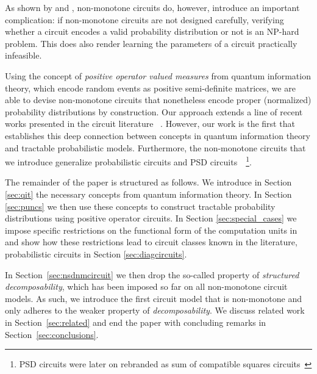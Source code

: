As shown by \citet{harviainen2023inference} and \citet{agarwalprobabilistic}, non-monotone circuits do, however, introduce an important complication: if non-monotone circuits are not designed carefully, verifying whether a circuit encodes a valid probability distribution or not is an NP-hard problem. This does also render learning the parameters of a circuit practically infeasible.

Using the concept of \textit{positive operator valued measures} from quantum information theory, which encode random events as positive semi-definite matrices, we are able to devise non-monotone circuits that nonetheless encode proper (normalized) probability distributions by construction.
Our approach extends a line of recent works presented in the circuit literature ~\citep{sladek2023encoding,loconte2024subtractive,wangrelationship,loconte2025sum}. However, our work is the first that establishes this deep connection between concepts in quantum information theory and tractable probabilistic models.
Furthermore, the non-monotone circuits that we introduce generalize probabilistic circuits and PSD circuits~~\citep{sladek2023encoding,loconte2024subtractive,loconte2025sum}\footnote{PSD circuits were later on rebranded as sum of compatible squares circuits~\citep{loconte2025sum}}.

The remainder of the paper is structured as follows. We introduce in Section \ref{sec:qit} the necessary concepts from quantum information theory. In Section \ref{sec:puncs} we then use these concepts to construct tractable probability distributions using positive operator circuits. In Section \ref{sec:special_cases} we impose specific restrictions on the functional form of the computation units in \puncs and show how these restrictions lead to circuit classes known in the literature, \eg probabilistic circuits in Section \ref{sec:diagcircuits}.

In Section~\ref{sec:nsdnmcircuit} we then drop the so-called property of \textit{structured decomposability}, which has been imposed so far on all non-monotone circuit models. As such, we introduce the first circuit model that is non-monotone and only adheres to the weaker property of \textit{decomposability}. We discuss related work in Section~\ref{sec:related} and end the paper with concluding remarks in Section~\ref{sec:conclusions}.








